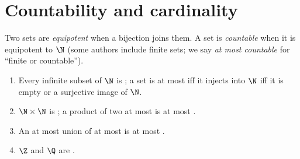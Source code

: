 \section{Countability and cardinality}

\begin{definition}\label{def:b2:structures:countable}
Two sets are \emph{equipotent} when a bijection
joins them. A set is \emph{countable} when it is
equipotent to $\N$ (some authors include finite sets; we say
\emph{at most countable} for ``finite or countable'').
\end{definition}

\begin{proposition}\label{prop:b2:structures:countablestable}
\begin{enumerate}
  \item Every infinite subset of $\N$ is ; a set is at most
         iff it injects into $\N$ iff it is empty or a
        surjective image of $\N$.
  \item $\N \times \N$ is ; a product of two at most
         is at most .
  \item An at most  union of at most  is at
        most .
  \item $\Z$ and $\Q$ are .
\end{enumerate}
\end{proposition}

